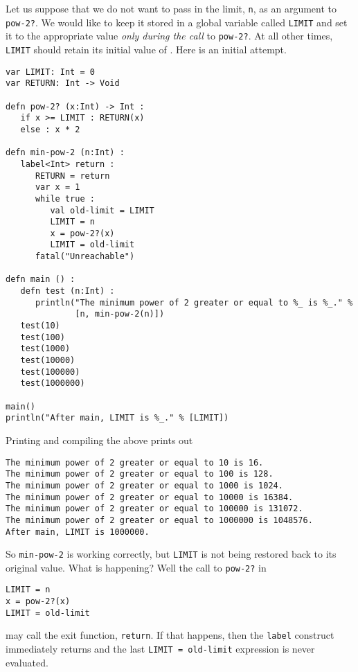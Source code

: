 \documentclass[10pt,oneside]{book}
\begin{document}
Let us suppose that we do not want to pass in the limit, \texttt{\frenchspacing n}, as an argument to \texttt{\frenchspacing pow-2?}. We would like to keep it stored in a global variable called \texttt{\frenchspacing LIMIT} and set it to the appropriate value {\em only during the call} to \texttt{\frenchspacing pow-2?}. At all other times, \texttt{\frenchspacing LIMIT} should retain its initial value of \texttt{}. Here is an initial attempt.
\begin{lstlisting}
var LIMIT: Int = 0
var RETURN: Int -> Void

defn pow-2? (x:Int) -> Int :
   if x >= LIMIT : RETURN(x)
   else : x * 2

defn min-pow-2 (n:Int) :
   label<Int> return :
      RETURN = return      
      var x = 1
      while true :
         val old-limit = LIMIT
         LIMIT = n
         x = pow-2?(x)
         LIMIT = old-limit
      fatal("Unreachable")

defn main () :
   defn test (n:Int) :
      println("The minimum power of 2 greater or equal to %_ is %_." %
              [n, min-pow-2(n)])
   test(10)
   test(100)
   test(1000)
   test(10000)
   test(100000)
   test(1000000)

main()
println("After main, LIMIT is %_." % [LIMIT])
\end{lstlisting}
Printing and compiling the above prints out
\begin{lstlisting}
The minimum power of 2 greater or equal to 10 is 16.
The minimum power of 2 greater or equal to 100 is 128.
The minimum power of 2 greater or equal to 1000 is 1024.
The minimum power of 2 greater or equal to 10000 is 16384.
The minimum power of 2 greater or equal to 100000 is 131072.
The minimum power of 2 greater or equal to 1000000 is 1048576.
After main, LIMIT is 1000000.
\end{lstlisting}
So \texttt{\frenchspacing min-pow-2} is working correctly, but \texttt{\frenchspacing LIMIT} is not being restored back to its original value. What is happening? Well the call to \texttt{\frenchspacing pow-2?} in
\begin{lstlisting}
LIMIT = n
x = pow-2?(x)
LIMIT = old-limit
\end{lstlisting}
may call the exit function, \texttt{\frenchspacing return}. If that happens, then the \texttt{\frenchspacing label} construct immediately returns and the last \texttt{\frenchspacing LIMIT = old-limit} expression is never evaluated. 
\end{document}
